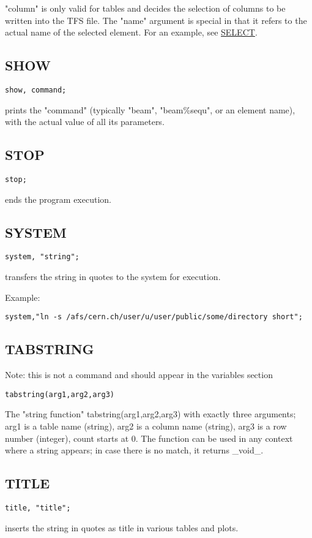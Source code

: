 "column" is only valid for tables and decides the selection of columns
to be written into the TFS file. The "name" argument is special in that
it refers to the actual name of the selected element. For an example,
see \href{../Introduction/select.html}{SELECT}.  


\subsection{SHOW}
\begin{verbatim}
show, command;
\end{verbatim} 
prints the "command" (typically "beam", "beam\%sequ", or an element
name), with the actual value of all its parameters.  


\subsection{STOP}
\begin{verbatim}
stop;
\end{verbatim} 
ends the program execution. 


\subsection{SYSTEM}
\begin{verbatim}
system, "string";
\end{verbatim} 
transfers the string in quotes to the system for execution.  

Example: 
\begin{verbatim}
system,"ln -s /afs/cern.ch/user/u/user/public/some/directory short";
\end{verbatim}


\subsection{TABSTRING}
Note: this is not a command and should appear in the variables section
\begin{verbatim}
tabstring(arg1,arg2,arg3)
\end{verbatim}  
The "string function" tabstring(arg1,arg2,arg3) with exactly  three
arguments; arg1 is a table name (string), arg2 is a column name
(string), arg3 is a row number (integer), count starts at 0. The
function can be used in any context where a string appears; in case
there is no match, it returns \_void\_.  


\subsection{TITLE}
\begin{verbatim}
title, "title";
\end{verbatim} 
inserts the string in quotes as title in various tables and plots.  


